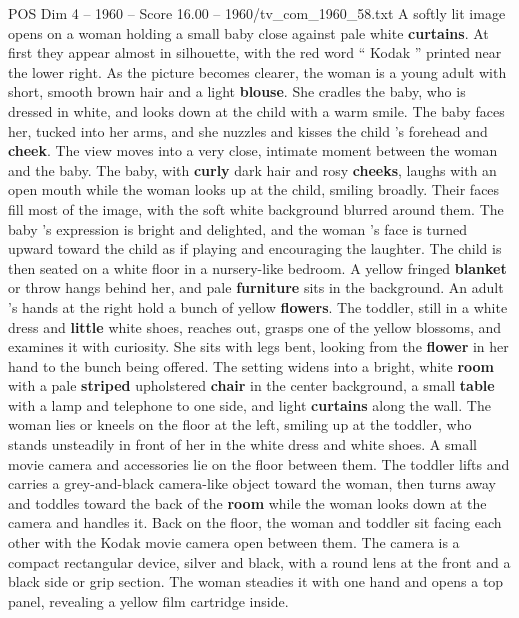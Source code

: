 \begin{textsample}{POS Dim 4 – 1960 – Score 16.00 – 1960/tv\_com\_1960\_58.txt}  \label{ex:f4_pos_065}
A softly lit image opens on a woman holding a small baby close against pale white \textbf{curtains}.
At first they appear almost in silhouette, with the red word “ Kodak ” printed near the lower right.
As the picture becomes clearer, the woman is a young adult with short, smooth brown hair and a light \textbf{blouse}.
She cradles the baby, who is dressed in white, and looks down at the child with a warm smile.
The baby faces her, tucked into her arms, and she nuzzles and kisses the child ’s forehead and \textbf{cheek}.
The view moves into a very close, intimate moment between the woman and the baby.
The baby, with \textbf{curly} dark hair and rosy \textbf{cheeks}, laughs with an open mouth while the woman looks up at the child, smiling broadly.
Their faces fill most of the image, with the soft white background blurred around them.
The baby ’s expression is bright and delighted, and the woman ’s face is turned upward toward the child as if playing and encouraging the laughter.
The child is then seated on a white floor in a nursery-like bedroom.
A yellow fringed \textbf{blanket} or throw hangs behind her, and pale \textbf{furniture} sits in the background.
An adult ’s hands at the right hold a bunch of yellow \textbf{flowers}.
The toddler, still in a white dress and \textbf{little} white shoes, reaches out, grasps one of the yellow blossoms, and examines it with curiosity.
She sits with legs bent, looking from the \textbf{flower} in her hand to the bunch being offered.
The setting widens into a bright, white \textbf{room} with a pale \textbf{striped} upholstered \textbf{chair} in the center background, a small \textbf{table} with a lamp and telephone to one side, and light \textbf{curtains} along the wall.
The woman lies or kneels on the floor at the left, smiling up at the toddler, who stands unsteadily in front of her in the white dress and white shoes.
A small movie camera and accessories lie on the floor between them.
The toddler lifts and carries a grey-and-black camera-like object toward the woman, then turns away and toddles toward the back of the \textbf{room} while the woman looks down at the camera and handles it.
Back on the floor, the woman and toddler sit facing each other with the Kodak movie camera open between them.
The camera is a compact rectangular device, silver and black, with a round lens at the front and a black side or grip section.
The woman steadies it with one hand and opens a top panel, revealing a yellow film cartridge inside.

\end{textsample}
